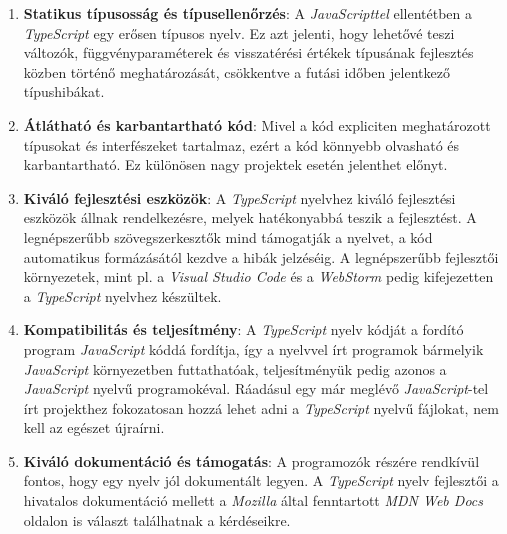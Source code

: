 \begin{enumerate}
	\item \textbf{Statikus típusosság és típusellenőrzés}:
	      A \textit{JavaScripttel} ellentétben a \textit{TypeScript} egy erősen
	      típusos nyelv. Ez azt jelenti, hogy lehetővé teszi változók,
	      függvényparaméterek és visszatérési értékek típusának fejlesztés közben
	      történő meghatározását, csökkentve a futási időben jelentkező
	      típushibákat.

	\item \textbf{Átlátható és karbantartható kód}:
	      Mivel a kód expliciten meghatározott típusokat és interfészeket
	      tartalmaz, ezért a kód könnyebb olvasható és karbantartható.
	      Ez különösen nagy projektek esetén jelenthet előnyt.

	\item \textbf{Kiváló fejlesztési eszközök}:
	      A \textit{TypeScript} nyelvhez kiváló fejlesztési eszközök állnak
	      rendelkezésre, melyek hatékonyabbá teszik a fejlesztést. A
	      legnépszerűbb szövegszerkesztők mind támogatják a nyelvet, a kód
	      automatikus formázásától kezdve a hibák jelzéséig. A legnépszerűbb
	      fejlesztői környezetek, mint pl. a \textit{Visual Studio Code} és
	      a \textit{WebStorm} pedig kifejezetten a \textit{TypeScript}
	      nyelvhez készültek.

	\item \textbf{Kompatibilitás és teljesítmény}:
	      A \textit{TypeScript} nyelv kódját a fordító program \textit{JavaScript}
	      kóddá fordítja, így a nyelvvel írt programok bármelyik
	      \textit{JavaScript} környezetben futtathatóak, teljesítményük
	      pedig azonos a \textit{JavaScript} nyelvű programokéval. Ráadásul egy
	      már meglévő \textit{JavaScript}-tel írt projekthez fokozatosan hozzá
	      lehet adni a \textit{TypeScript} nyelvű fájlokat, nem kell az egészet
	      újraírni.

	\item \textbf{Kiváló dokumentáció és támogatás}:
	      A programozók részére rendkívül fontos, hogy egy nyelv jól dokumentált
	      legyen. A \textit{TypeScript} nyelv fejlesztői a hivatalos dokumentáció
	      \cite{TS_Microsoft} mellett a \textit{Mozilla} által fenntartott
	      \textit{MDN Web Docs} \cite{JS_Mozilla} oldalon is választ találhatnak
	      a kérdéseikre.
\end{enumerate}

